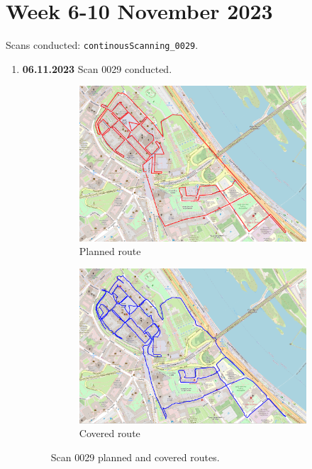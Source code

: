 \documentclass[a4paper,12pt]{book}
\begin{document}
\section{Week 6-10 November 2023}
Scans conducted: \verb|continousScanning_0029|.\\
\begin{enumerate}
	\item \textbf{06.11.2023} Scan 0029 conducted.
	\begin{figure}[H]
		\centering
		\begin{subfigure}{.95\textwidth}
			\centering
			\includegraphics[width=1\linewidth]{route_p29}
			\caption{Planned route}
			\label{fig:a29}
		\end{subfigure}%
		\linebreak
		\begin{subfigure}{.95\textwidth}
			\centering
			\includegraphics[width=1\linewidth]{route_c29}
			\caption{Covered route}
			\label{fig:b29}
		\end{subfigure}
		\caption{Scan 0029 planned and covered routes.}
		\label{fig:fig29}
	\end{figure}
\end{enumerate}
\end{document}
